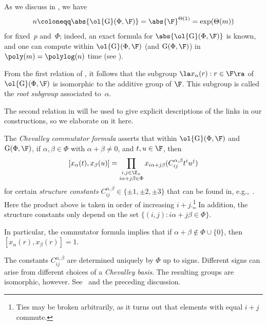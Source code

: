 \documentclass[11pt]{article}
\newcommand{\rnote}[1]{}
\newcommand{\Esc}[2]{\ol{\mathrm{G}}(#1,#2)}
\newcommand{\Gad}[2]{\mathrm{G}(#1,#2)}
\newcommand{\G}[2]{\mathrm{G}(#1,#2)}
\newcommand{\Const}[4]{C^{#1,#2}_{#3 #4}}
\begin{document}
As we discuss in , we have
\[
    n \coloneqq \abs{\Esc{\Phi}{\F}} = \abs{\F}^{\Theta(1)} = \exp(\Theta(m))
\]
for fixed~$p$ and~$\Phi$; indeed, an exact formula for $\abs{\Esc{\Phi}{\F}}$ is known, and one can compute within $\Esc{\Phi}{\F}$ (and $\Gad{\Phi}{\F}$) in $\poly(m) = \polylog(n)$ time (see ).


\begin{remark}
    From the first relation of , it follows that the subgroup $\la x_\alpha(r) : r \in \F\ra$ of $\Esc{\Phi}{\F}$ is isomorphic to the additive group of $\F$. This subgroup is called the \emph{root subgroup} associated to~$\alpha$.
\end{remark}

The second relation in  will be used to give explicit descriptions of the links in our constructions, so we elaborate on it here.
\begin{theorem}\label{fact:chevcom}
    The \emph{Chevalley commutator formula} asserts that within $\Esc{\Phi}{\F}$ and $\G{\Phi}{\F}$, if $\alpha, \beta \in \Phi$ with $\alpha + \beta \neq 0$, and $t,u \in \F$, then %
    \[
        [x_\alpha(t), x_\beta(u)] = \prod_{\substack{i,j \in \Z_+ \\ i\alpha + j\beta \in \Phi}} x_{i\alpha + j\beta}(\Const{\alpha}{\beta}{i}{j} t^i u^j)
    \]
    for certain \emph{structure constants} $\Const{\alpha}{\beta}{i}{j} \in \{\pm 1, \pm 2, \pm 3\}$ that can be found in, e.g.,~\cite[Sec.~5.2]{Car89}. Here the product above is taken in order of increasing $i+j$.\footnote{Ties may be broken arbitrarily, as it turns out that  elements with equal $i+j$ commute.} %
    In addition, the structure constants only depend on  the set $\{(i,j):i\alpha+j\beta \in \Phi \}$.\rnote{I don't really know what this comment means}
\end{theorem}
\begin{remark}
In particular, the commutator formula implies that if $\alpha + \beta \not \in \Phi \cup \{0\}$, then $[x_\alpha(r), x_\beta(r)] = 1$.
\end{remark}
\begin{remark}\label{rmk:signs}
The constants $\Const{\alpha}{\beta}{i}{j}$ are determined uniquely by $\Phi$ up to signs. Different signs can arise from different choices of a \emph{Chevalley basis}. The resulting groups are isomorphic, however. See~\cite[Prop.~4.2.2]{Car89} and the preceding discussion.\rnote{I don't really know what this remark means.}
\end{remark}
\end{document}
